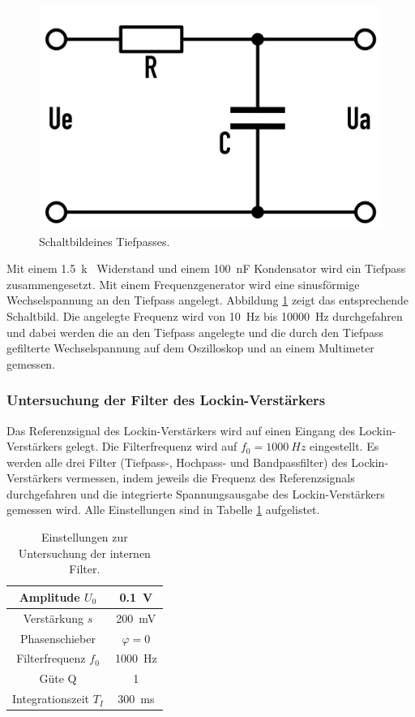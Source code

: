 \documentclass[12pt,a4paper]{article}
\begin{document}
\begin{figure}[H]
\centering
\includegraphics[scale=0.1]{Bilder/Vorversuch1/Tiefpass_Schaltbild.png}
\caption[test]{Schaltbild\footnotemark eines Tiefpasses.}
\label{fig:Tiefpass_Schaltbild}
\end{figure}

Mit einem \SI{1,5}{k \Omega} Widerstand und einem \SI{100}{nF} Kondensator wird ein Tiefpass zusammengesetzt. Mit einem Frequenzgenerator wird eine sinusförmige Wechselspannung an den Tiefpass angelegt. Abbildung \ref{fig:Tiefpass_Schaltbild} zeigt das entsprechende Schaltbild. Die angelegte Frequenz wird von \SI{10}{Hz} bis \SI{10000}{Hz} durchgefahren und dabei werden die an den Tiefpass angelegte und die durch den Tiefpass gefilterte Wechselspannung auf dem Oszilloskop und an einem Multimeter gemessen.

\subsubsection{Untersuchung der Filter des Lockin-Verstärkers}
Das Referenzsignal des Lockin-Verstärkers wird auf einen Eingang des Lockin-Verstärkers gelegt. Die Filterfrequenz wird auf $f_0 = \SI{1000}{Hz}$ eingestellt. Es werden alle drei Filter (Tiefpass-, Hochpass- und Bandpassfilter) des Lockin-Verstärkers vermessen, indem jeweils die Frequenz des Referenzsignals durchgefahren und die integrierte Spannungsausgabe des Lockin-Verstärkers gemessen wird. Alle Einstellungen sind in Tabelle \ref{tab:vor2} aufgelistet.

\begin{table}[H]
\centering
\begin{tabular}{|c|c|}
\hline 
Amplitude $U_0$ & \SI{0,1}{V} \\
\hline 
Verstärkung $s$ & \SI{200}{mV} \\ 
\hline 
Phasenschieber & $\varphi = 0$ \\ 
\hline 
Filterfrequenz $f_0$ & \SI{1000}{Hz} \\ 
\hline 
Güte Q & 1 \\ 
\hline
Integrationszeit $T_I$ & \SI{300}{ms} \\ 
\hline 
\end{tabular} 
\caption{Einstellungen zur Untersuchung der internen Filter.}
\label{tab:vor2}
\end{table}
\end{document}

